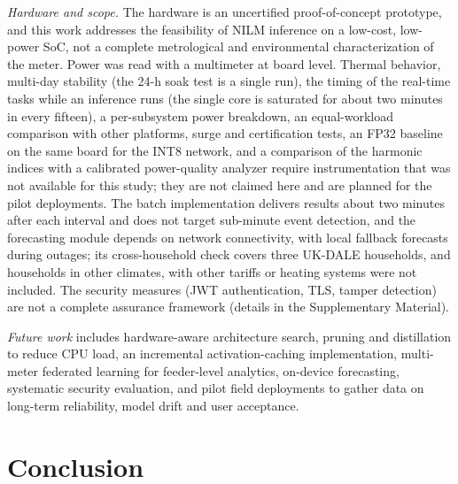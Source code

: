 \documentclass[fleqn,10pt]{wlscirep}
\begin{document}
\textit{Hardware and scope.} The hardware is an uncertified proof-of-concept prototype, and this work addresses the feasibility of NILM inference on a low-cost, low-power SoC, not a complete metrological and environmental characterization of the meter. Power was read with a multimeter at board level. Thermal behavior, multi-day stability (the 24-h soak test is a single run), the timing of the real-time tasks while an inference runs (the single core is saturated for about two minutes in every fifteen), a per-subsystem power breakdown, an equal-workload comparison with other platforms, surge and certification tests, an FP32 baseline on the same board for the INT8 network, and a comparison of the harmonic indices with a calibrated power-quality analyzer require instrumentation that was not available for this study; they are not claimed here and are planned for the pilot deployments. The batch implementation delivers results about two minutes after each interval and does not target sub-minute event detection, and the forecasting module depends on network connectivity, with local fallback forecasts during outages; its cross-household check covers three UK-DALE households, and households in other climates, with other tariffs or heating systems were not included. The security measures (JWT authentication, TLS, tamper detection) are not a complete assurance framework (details in the Supplementary Material).

\textit{Future work} includes hardware-aware architecture search, pruning and distillation to reduce CPU load, an incremental activation-caching implementation, multi-meter federated learning for feeder-level analytics, on-device forecasting, systematic security evaluation, and pilot field deployments to gather data on long-term reliability, model drift and user acceptance.

\section{Conclusion}
\label{sec:conclusion}
\end{document}
